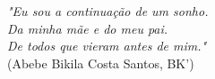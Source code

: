 \begin{epigrafe}
    \vspace*{\fill}
 	\begin{flushright}
		\textit{"Eu sou a continuação de um sonho.\\Da minha mãe e do meu pai.\\De todos que vieram antes de mim."}\\
            (Abebe Bikila Costa Santos, BK')
	\end{flushright}
\end{epigrafe}
